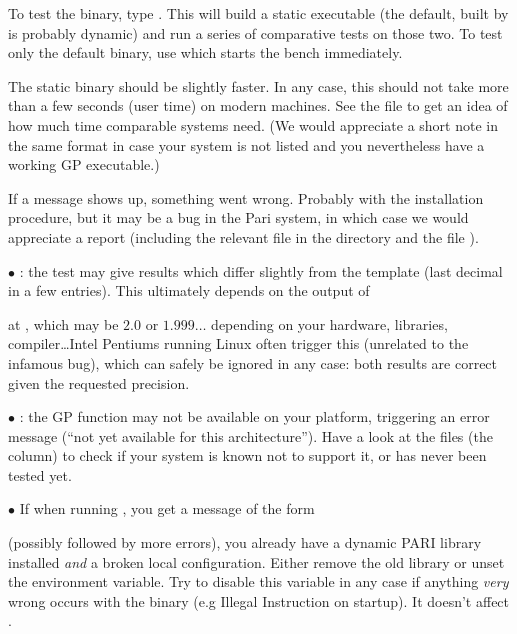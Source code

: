 To test the binary, type . This will build a static
executable (the default, built by  is probably dynamic) and
run a series of comparative tests on those two. To test only the default
binary, use  which starts the bench immediately.

The static binary should be slightly faster. In any case, this should not
take more than a few seconds (user time) on modern machines. See the file
 to get an idea of how much time comparable systems need. (We
would appreciate a short note in the same format in case your system is not
listed and you nevertheless have a working GP executable.)

If a \kbd{[BUG]} message shows up, something went wrong. Probably with the
installation procedure, but it may be a bug in the Pari system, in which
case we would appreciate a report (including the relevant  file
in the  directory and the file ).


$\bullet$ : the test 
may give results which differ slightly from the template (last decimal in a
few entries). This ultimately depends on the output of


\noindent at , which may be $2.0$ or $1.999\dots$ depending on
your hardware, libraries, compiler\dots Intel Pentiums running Linux often
trigger this  (unrelated to the infamous  bug), which
can safely be ignored in any case: both results are correct given the
requested precision.

$\bullet$ : the GP function  may not be available on
your platform, triggering an error message (``not yet available for this
architecture''). Have a look at the  files (the 
column) to check if your system is known not to support it, or has never
been tested yet.

$\bullet$ If when running , you get a message of the form


\noindent (possibly followed by more errors), you already have a dynamic PARI
library installed {\it and\/} a broken local configuration. Either remove the
old library or unset the  environment variable. Try to
disable this variable in any case if anything {\it very} wrong occurs with
the  binary (e.g Illegal Instruction on startup). It doesn't
affect .

